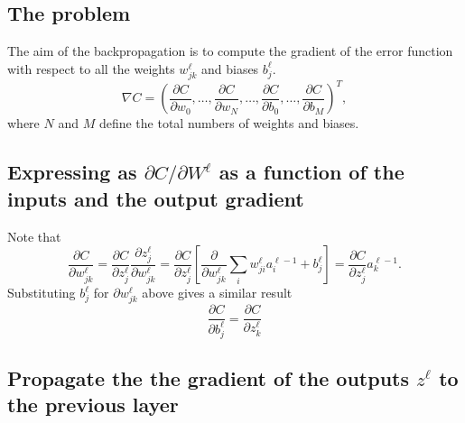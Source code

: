 \documentclass[a4paper,10pt]{article}
\begin{document}
\subsection{The problem}

The aim of the backpropagation is to compute the gradient of the error function
with respect to all the weights $w_{jk}^\ell$ and biases $b_j^\ell$.
\[
    \nabla C =
    \left(\frac{\partial C}{\partial w_0}, \ldots,\frac{\partial C}{\partial w_N}, \ldots,\frac{\partial C}{\partial b_0}, \ldots,\frac{\partial C}{\partial b_M} \right)^T,
\]
where $N$ and $M$ define the total numbers of weights and biases.

\subsection{Expressing as $\partial C / \partial W^\ell$ as a function of the inputs and the output gradient}

Note that
\[
    \frac{\partial C}{\partial w_{jk}^\ell} = \frac{\partial C}{\partial z_j^\ell} \frac{\partial z_j^\ell}{\partial w_{jk}^\ell} = \frac{\partial C}{\partial z_j^\ell} \left[ \frac{\partial}{\partial w_{jk}^\ell} \sum_i w_{ji}^\ell a_{i}^{\ell-1} + b_j^\ell \right] = \frac{\partial C}{\partial z_j^\ell} a_{k}^{\ell-1}.
\]
Substituting $b_j^\ell$ for $\partial w_{jk}^\ell$ above gives a similar result
\[
    \frac{\partial C}{\partial b_{j}^\ell} = \frac{\partial C}{\partial z_k^\ell}
\]

\subsection{Propagate the the gradient of the outputs $z^\ell$ to the previous layer}
\end{document}
